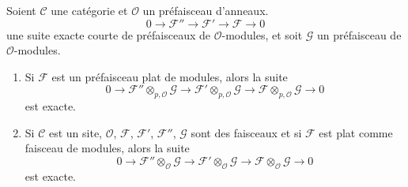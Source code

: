 \begin{lemma}

\label{lemma-flat-tor-zero}

Soient $\mathcal{C}$ une catégorie et $\mathcal{O}$ un préfaisceau d'anneaux.
$$
0 \to \mathcal{F}'' \to \mathcal{F}' \to \mathcal{F} \to 0
$$
une suite exacte courte de préfaisceaux de $\mathcal{O}$-modules, et soit
$\mathcal{G}$ un préfaisceau de $\mathcal{O}$-modules.

\begin{enumerate}

\item Si $\mathcal{F}$ est un préfaisceau plat de modules, alors la suite
$$
0 \to
\mathcal{F}'' \otimes_{p, \mathcal{O}} \mathcal{G} \to
\mathcal{F}' \otimes_{p, \mathcal{O}} \mathcal{G} \to
\mathcal{F} \otimes_{p, \mathcal{O}} \mathcal{G} \to 0
$$
est exacte.
\item Si $\mathcal{C}$ est un site, $\mathcal{O}$,
$\mathcal{F}$, $\mathcal{F}'$, $\mathcal{F}''$,
$\mathcal{G}$ sont des faisceaux et si $\mathcal{F}$ est plat comme faisceau
de modules, alors la suite
$$
0 \to
\mathcal{F}'' \otimes_\mathcal{O} \mathcal{G} \to
\mathcal{F}' \otimes_\mathcal{O} \mathcal{G} \to
\mathcal{F} \otimes_\mathcal{O} \mathcal{G} \to 0
$$
est exacte.

\end{enumerate}

\end{lemma}

